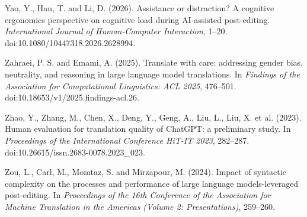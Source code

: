 \documentclass[11pt]{article}
\begin{document}
Yao, Y., Han, T. and Li, D. (2026). Assistance or distraction? A cognitive ergonomics perspective on cognitive load during AI-assisted post-editing. \emph{International Journal of Human-Computer Interaction}, 1--20. doi:10.1080/10447318.2026.2628994.

Zahraei, P. S. and Emami, A. (2025). Translate with care: addressing gender bias, neutrality, and reasoning in large language model translations. In \emph{Findings of the Association for Computational Linguistics: ACL 2025}, 476--501. doi:10.18653/v1/2025.findings-acl.26.

Zhao, Y., Zhang, M., Chen, X., Deng, Y., Geng, A., Liu, L., Liu, X. et al. (2023). Human evaluation for translation quality of ChatGPT: a preliminary study. In \emph{Proceedings of the International Conference HiT-IT 2023}, 282--287. doi:10.26615/issn.2683-0078.2023\_023.

Zou, L., Carl, M., Momtaz, S. and Mirzapour, M. (2024). Impact of syntactic complexity on the processes and performance of large language models-leveraged post-editing. In \emph{Proceedings of the 16th Conference of the Association for Machine Translation in the Americas (Volume 2: Presentations)}, 259--260.
\end{document}
